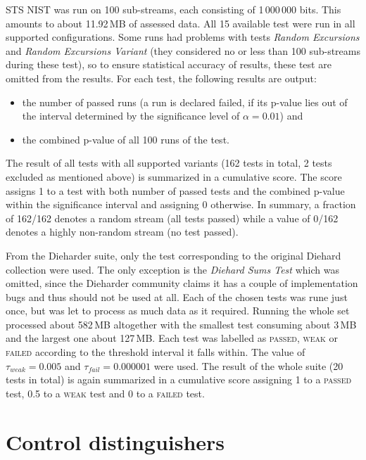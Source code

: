 \documentclass[12pt,oneside]{fithesis2}
\newcommand{\squarebullet}{\textcolor{black}{\raisebox{0.15em}{\rule{4pt}{4pt}}}}
\newenvironment{myItemize}{
  \begin{itemize}[leftmargin=2em,rightmargin=1em,itemsep=\parskip ,parsep=0em,topsep=0em,partopsep=0em]
  \renewcommand{\labelitemi}{\squarebullet}
  \renewcommand{\labelitemii}{$\diamond$}
}{
  \end{itemize}
}
\begin{document}
STS NIST was run on 100 sub-streams, each consisting of 1\,000\,000 bits. This amounts to about 11.92\,MB of assessed data.
All 15 available test were run in all supported configurations. Some runs had problems with tests \textit{Random Excursions} 
and \textit{Random Excursions Variant} (they considered no or less than 100 sub-streams during these test), 
so to ensure statistical accuracy of results, these test are omitted from the results.
For each test, the following results are output:
\begin{myItemize}
\item the number of passed runs (a run is declared failed, if its p-value lies out of the interval determined by the significance
level of $\alpha = 0.01$) and
\item the combined p-value of all 100 runs of the test.
\end{myItemize}
The result of all tests with all supported variants (162 tests in total, 2 tests excluded as mentioned above) 
is summarized in a cumulative score. The score assigns 1 to a test with both number of passed tests and the
combined p-value within the significance interval and assigning 0 otherwise. 
In summary, a fraction of 162/162 denotes a random stream (all tests passed) while a value of 0/162 denotes a highly non-random
stream (no test passed).

From the Dieharder suite, only the test corresponding to the original Diehard collection were used.
The only exception is the \textit{Diehard Sums Test} which was omitted, since the Dieharder community claims it has a couple of
implementation bugs and thus should not be used at all. Each of the chosen tests was rune just once, but was let
to process as much data as it required. Running the whole set processed about 582\,MB altogether with the smallest test
consuming about 3\,MB and the largest one about 127\,MB. Each test was labelled as \textsc{passed}, \textsc{weak} or \textsc{failed}
according to the threshold interval it falls within. The value of $\tau_{weak} = 0.005$ and $\tau_{fail} = 0.000001$ were used.
The result of the whole suite (20 tests in total) is again summarized in a cumulative score assigning 1 to a \textsc{passed} test,
0.5 to a \textsc{weak} test and 0 to a \textsc{failed} test.

\chapter{Control distinguishers}
\label{chap:distinguish-control}
\end{document}

